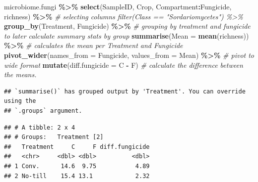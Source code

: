 \documentclass[
]{article}
\newenvironment{Shaded}{\begin{snugshade}}{\end{snugshade}}
\newcommand{\AttributeTok}[1]{\textcolor[rgb]{0.13,0.29,0.53}{#1}}
\newcommand{\CommentTok}[1]{\textcolor[rgb]{0.56,0.35,0.01}{\textit{#1}}}
\newcommand{\FunctionTok}[1]{\textcolor[rgb]{0.13,0.29,0.53}{\textbf{#1}}}
\newcommand{\NormalTok}[1]{#1}
\newcommand{\SpecialCharTok}[1]{\textcolor[rgb]{0.81,0.36,0.00}{\textbf{#1}}}
\begin{document}
\begin{Shaded}
\begin{Highlighting}[]
\NormalTok{microbiome.fungi }\SpecialCharTok{\%\textgreater{}\%}
  \FunctionTok{select}\NormalTok{(SampleID, Crop, Compartment}\SpecialCharTok{:}\NormalTok{Fungicide, richness) }\SpecialCharTok{\%\textgreater{}\%} \CommentTok{\# selecting columns  filter(Class == "Sordariomycetes") \%\textgreater{}\%}
  \FunctionTok{group\_by}\NormalTok{(Treatment, Fungicide) }\SpecialCharTok{\%\textgreater{}\%} \CommentTok{\# grouping by treatment and fungicide to later calculate summary stats by group}
  \FunctionTok{summarise}\NormalTok{(}\AttributeTok{Mean =} \FunctionTok{mean}\NormalTok{(richness)) }\SpecialCharTok{\%\textgreater{}\%} \CommentTok{\# calculates the mean per Treatment and Fungicide }
  \FunctionTok{pivot\_wider}\NormalTok{(}\AttributeTok{names\_from =}\NormalTok{ Fungicide, }\AttributeTok{values\_from =}\NormalTok{ Mean) }\SpecialCharTok{\%\textgreater{}\%} \CommentTok{\# pivot to wide format}
  \FunctionTok{mutate}\NormalTok{(}\AttributeTok{diff.fungicide =}\NormalTok{ C }\SpecialCharTok{{-}}\NormalTok{ F) }\CommentTok{\# calculate the difference between the means. }
\end{Highlighting}
\end{Shaded}

\begin{verbatim}
## `summarise()` has grouped output by 'Treatment'. You can override using the
## `.groups` argument.
\end{verbatim}

\begin{verbatim}
## # A tibble: 2 x 4
## # Groups:   Treatment [2]
##   Treatment     C     F diff.fungicide
##   <chr>     <dbl> <dbl>          <dbl>
## 1 Conv.      14.6  9.75           4.89
## 2 No-till    15.4 13.1            2.32
\end{verbatim}
\end{document}
